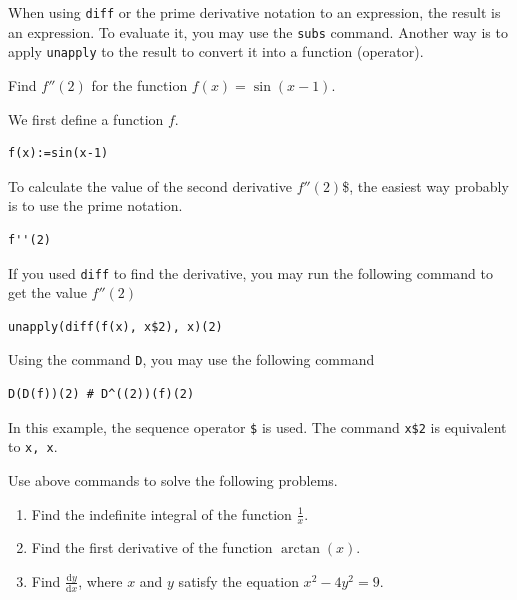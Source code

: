 \documentclass[
  12pt]{elegantbook}
\providecommand{\tightlist}{%
  \setlength{\itemsep}{0pt}\setlength{\parskip}{0pt}}
\begin{document}
When using \texttt{diff} or the prime derivative notation to an expression, the result is an expression. To evaluate it, you may use the \texttt{subs} command. Another way is to apply \texttt{unapply} to the result to convert it into a function (operator).

\begin{example}
Find \(f''(2)\) for the function \(f(x)=\sin(x-1)\).
\end{example}

\begin{solution}

We first define a function \(f\).

\begin{verbatim}
f(x):=sin(x-1)
\end{verbatim}

To calculate the value of the second derivative \(f''(2)\)\$, the easiest way probably is to use the prime notation.

\begin{verbatim}
f''(2)
\end{verbatim}

If you used \texttt{diff} to find the derivative, you may run the following command to get the value \(f''(2)\)

\begin{verbatim}
unapply(diff(f(x), x$2), x)(2)
\end{verbatim}

Using the command \texttt{D}, you may use the following command

\begin{verbatim}
D(D(f))(2) # D^((2))(f)(2)
\end{verbatim}

\end{solution}

In this example, the sequence operator \texttt{\$} is used. The command \texttt{x\$2} is equivalent to \texttt{x,\ x}.

\begin{exercise}

Use above commands to solve the following problems.

\begin{enumerate}
\def\labelenumi{\arabic{enumi}.}
\tightlist
\item
  Find the indefinite integral of the function \(\frac1x\).
\item
  Find the first derivative of the function \(\arctan(x)\).
\item
  Find \(\frac{\mathrm{d} y}{\mathrm{d} x}\), where \(x\) and \(y\) satisfy the equation \(x^2-4y^2=9\).
\end{enumerate}

\end{exercise}
\end{document}
